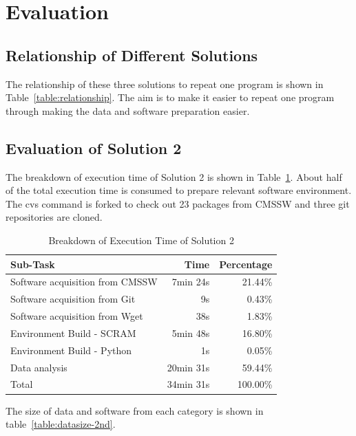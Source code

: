 \documentclass{acm_proc_article-sp}
\begin{document}
\section{Evaluation}
\subsection{Relationship of Different Solutions}
The relationship of these three solutions to repeat one program is shown in Table~\ref{table:relationship}. The aim is to make it easier to repeat one program through making the data and software preparation easier.

\subsection{Evaluation of Solution 2}
The breakdown of execution time of Solution 2 is shown in Table~\ref{table:time-2nd}. About half of the total execution time is consumed to prepare relevant software environment. The cvs command is forked to check out 23 packages from CMSSW and three git repositories are cloned.

\begin{table}
    \centering
    \begin{tabular}{|l|r|r|}
    \hline
    Sub-Task & Time & Percentage \\ \hline
    Software acquisition from CMSSW & 7min 24s & 21.44\% \\ \hline
    Software acquisition from Git & 9s & 0.43\% \\ \hline
    Software acquisition from Wget & 38s & 1.83\% \\ \hline
    Environment Build - SCRAM & 5min 48s & 16.80\% \\ \hline
    Environment Build - Python & 1s & 0.05\% \\ \hline
    Data analysis & 20min 31s & 59.44\% \\ \hline
    Total & 34min 31s & 100.00\% \\ \hline
    \end{tabular}
    \caption{Breakdown of Execution Time of Solution 2}
    \label{table:time-2nd}
\end{table}

The size of data and software from each category is shown in table~\ref{table:datasize-2nd}.
\end{document}
